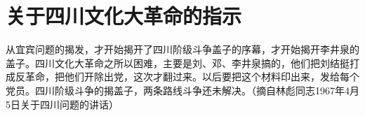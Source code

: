 \section[关于四川文化大革命的指示（一九六七年四月）]{关于四川文化大革命的指示}


从宜宾问题的揭发，才开始揭开了四川阶级斗争盖子的序幕，才开始揭开李井泉的盖子。四川文化大革命之所以困难，主要是刘、邓、李井泉搞的，他们把刘结挺打成反革命，把他们开除出党，这次才翻过来。以后要把这个材料印出来，发给每个党员。四川阶级斗争的揭盖子，两条路线斗争还未解决。（摘自林彪同志1967年4月5日关于四川问题的讲话）

